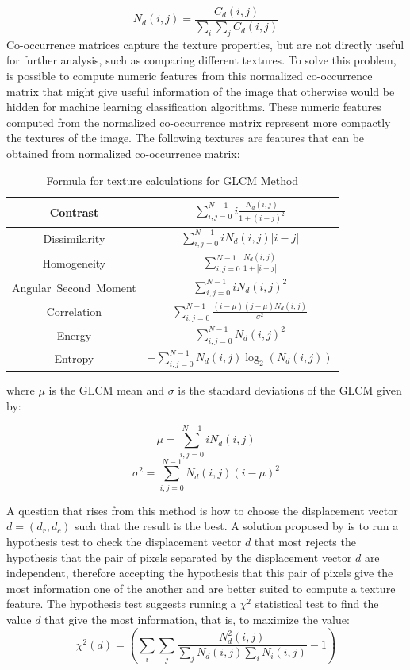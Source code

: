 \begin{equation}
\label{eq:normalized}
    N_d(i,j) = \frac{C_d(i,j)}{\sum_i\sum_j C_d(i,j)}
\end{equation}
Co-occurrence matrices capture the texture properties, but are not directly useful for further analysis, such as comparing different textures. To solve this problem, is possible to compute numeric features from this normalized co-occurrence matrix that might give useful information of the image that otherwise would be hidden for machine learning classification algorithms. These numeric features computed from the normalized co-occurrence matrix represent more compactly the textures of the image.
The following textures are features that can be obtained from normalized co-occurrence matrix:
\begin{table}[H]
\centering
\begin{tabular}{ |c |c |}
 \hline Contrast & $\sum_{i,j=0}^{N-1} i\frac{N_d(i,j)}{1+(i-j)^2}$\\ 
 \hline Dissimilarity & $\sum_{i,j=0}^{N-1} i N_d(i,j)|i-j|$\\
 \hline Homogeneity & $\sum_{i,j=0}^{N-1}\frac{N_d(i,j)}{1+|i-j|}$\\
 \hline Angular\ Second\ Moment & $\sum_{i,j=0}^{N-1} i N_d(i,j)^2$\\
 \hline Correlation & $\sum_{i,j=0}^{N-1}\frac{(i-\mu)(j-\mu)N_d(i,j)}{\sigma^2}$\\
 \hline Energy & $\sum_{i,j=0}^{N-1}N_d(i,j)^2$\\
 \hline Entropy & $ -\sum_{i,j=0}^{N-1}N_d(i,j)\log_2(N_d(i,j))$\\
 \hline
\end{tabular}
\caption{Formula for texture calculations for GLCM Method}
\label{table:glcm_calculations}
\end{table}

where $\mu$ is the GLCM mean and $\sigma$ is the standard deviations of the GLCM given by:

\begin{equation}
    \mu=\sum_{i,j=0}^{N-1}iN_d(i,j)
\end{equation}
\begin{equation}
    \sigma^2=\sum_{i,j=0}^{N-1}N_d(i,j)(i-\mu)^2
\end{equation}

A question that rises from this method is how to choose the displacement vector $d=(d_r,d_c)$ such that the result is the best. A solution proposed by  \cite{Zucker} is to run a hypothesis test to check the displacement vector $d$ that most rejects the hypothesis that the pair of pixels separated by the displacement vector $d$ are independent, therefore accepting the hypothesis that this pair of pixels give the most information one of the another and are better suited to compute a texture feature.
The hypothesis test suggests running a $\chi^2$ statistical test to find the value $d$ that give the most information, that is, to maximize the value:
\begin{equation}
    \chi^2(d) = \left(\sum_i\sum_j \frac{N_d^2(i,j)}{\sum_jN_d(i,j)\sum_iN_i(i,j)} -1\right)
\end{equation}

